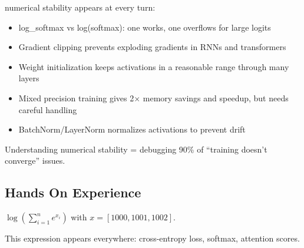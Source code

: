  numerical stability appears at every turn:
\begin{itemize}
    \item log\_softmax vs log(softmax): one works, one overflows for large logits
    \item Gradient clipping prevents exploding gradients in RNNs and transformers
    \item Weight initialization keeps activations in a reasonable range through many layers
    \item Mixed precision training gives 2$\times$ memory savings and speedup, but needs careful handling
    \item BatchNorm/LayerNorm normalizes activations to prevent drift
\end{itemize}

 Understanding numerical stability = debugging 90\% of ``training doesn't converge'' issues.



\newpage
\subsection{Hands On Experience}
 

 $\log\left(\sum_{i=1}^{n} e^{x_i}\right)$ with $x = [1000, 1001, 1002]$.

This expression appears everywhere: cross-entropy loss, softmax, attention scores.

\begin{marginfigure}
    \centering
    \caption{The exponential function reaches the FP64 limit ($\approx 1.8 \times 10^{308}$) at $x \approx 709$. Beyond this, $e^x$ returns Inf.}
    \label{fig:exp_overflow}
\end{marginfigure}

